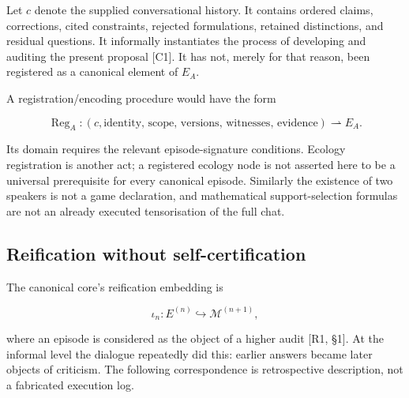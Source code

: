 \documentclass[11pt,a4paper]{article}
\begin{document}
Let \(c\) denote the supplied conversational history. It contains
ordered claims, corrections, cited constraints, rejected formulations,
retained distinctions, and residual questions. It informally
instantiates the process of developing and auditing the present proposal
{[}C1{]}. It has not, merely for that reason, been registered as a
canonical element of \(E_A\).

A registration/encoding procedure would have the form

\nopagebreak[4]

\[
\operatorname{Reg}_A:
(c,\text{identity, scope, versions, witnesses, evidence})
\rightharpoonup E_A.
\]

Its domain requires the relevant episode-signature conditions. Ecology
registration is another act; a registered ecology node is not asserted
here to be a universal prerequisite for every canonical episode.
Similarly the existence of two speakers is not a game declaration, and
mathematical support-selection formulas are not an already executed
tensorisation of the full chat.

\subsection{Reification without
self-certification}\label{reification-without-self-certification}

The canonical core's reification embedding is

\nopagebreak[4]

\[\iota_n:E^{(n)}\hookrightarrow\mathcal M^{(n+1)},\]

where an episode is considered as the object of a higher audit {[}R1,
§1{]}. At the informal level the dialogue repeatedly did this: earlier
answers became later objects of criticism. The following correspondence
is retrospective description, not a fabricated execution log.
\end{document}
